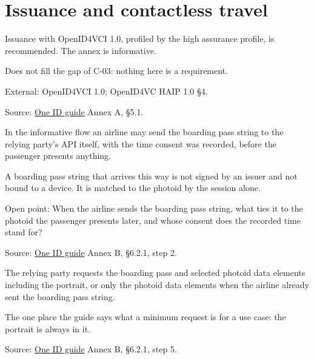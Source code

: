 
\section{Issuance and contactless travel}

\begin{definition}
  \label{def:c92}
  Issuance with OpenID4VCI 1.0, profiled by the high assurance profile, is
  recommended. The annex is informative.

  Does not fill the gap of C-03: nothing here is a requirement.

  External: OpenID4VCI 1.0; OpenID4VC HAIP 1.0 §4.

  Source:
  \href{https://standards.atlassian.net/wiki/spaces/OneID/pages/2947416082/Technical+Implementation+Guide}{One
  ID guide} Annex A, §5.1.
\end{definition}

\begin{definition}
  \label{def:c93}
  \notready
  In the informative flow an airline may send the boarding pass string to the
  relying party's API itself, with the time consent was recorded, before the
  passenger presents anything.

  A boarding pass string that arrives this way is not signed by an issuer and
  not bound to a device. It is matched to the photoid by the session alone.

  Open point: When the airline sends the boarding pass string, what ties it
  to the photoid the passenger presents later, and whose consent does the
  recorded time stand for?

  Source:
  \href{https://standards.atlassian.net/wiki/spaces/OneID/pages/2947416082/Technical+Implementation+Guide}{One
  ID guide} Annex B, §6.2.1, step 2.
\end{definition}

\begin{definition}
  \label{def:c94}
  The relying party requests the boarding pass and selected photoid data
  elements including the portrait, or only the photoid data elements when the
  airline already sent the boarding pass string.

  The one place the guide says what a minimum request is for a use case: the
  portrait is always in it.

  Source:
  \href{https://standards.atlassian.net/wiki/spaces/OneID/pages/2947416082/Technical+Implementation+Guide}{One
  ID guide} Annex B, §6.2.1, step 5.
\end{definition}

